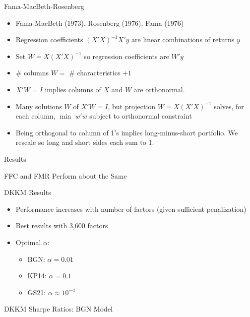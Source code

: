 \documentclass[aspectratio=169]{beamer}
\begin{document}
\begin{frame}{Fama-MacBeth-Rosenberg}
\begin{itemize}
  \item Fama-MacBeth (1973), Rosenberg (1976), Fama (1976)
  \item Regression coefficients $(X'X)^{-1}X'y$ are linear combinations of returns $y$
  \item Set $W = X(X'X)^{-1}$ so regression coefficients are $W'y$
  \item \# columns $W=$ \# characteristics $+1$
  \item $X'W=I$ implies columns of $X$ and $W$ are orthonormal.
  \item Many solutions $W$ of $X'W=I$, but projection $W=X(X'X)^{-1}$ solves, for each column, $\min \; w'w$ subject to orthonormal constraint
  \item Being orthogonal to column of 1's implies long-minus-short portfolio.  We rescale so long and short sides each sum to 1.
\end{itemize}
\end{frame}


\begin{frame}[c]
  \centering
  \Huge Results
\end{frame}


\begin{frame}{FFC and FMR Perform about the Same}
  \centering
  
\end{frame}

\begin{frame}{DKKM Results}
\begin{itemize}
  \item Performance increases with number of factors (given sufficient penalization)
  \item Best results with 3,600 factors
  \item Optimal $\alpha$:
  \begin{itemize}
    \item BGN: $\alpha = 0.01$
    \item KP14: $\alpha = 0.1$
    \item GS21: $\alpha \approx 10^{-4}$
  \end{itemize}
\end{itemize}
\end{frame}

\begin{frame}{DKKM Sharpe Ratios: BGN Model}
  \centering
  
\end{frame}
\end{document}
